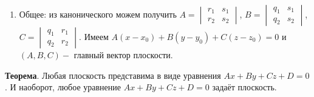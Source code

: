 \documentclass[a4paper]{article}
\begin{document}
\begin{enumerate}
                             \item Общее: из канонического можем получить $A = \begin{vmatrix}
                                                                                   r_1 & s_1 \\
                                                                                   r_2 & s_2
                             \end{vmatrix}$, $B = \begin{vmatrix}
                                                      q_1 & s_1 \\
                                                      q_2 & s_2
                             \end{vmatrix}$, $C = \begin{vmatrix}
                                                      q_1 & r_1 \\
                                                      q_2 & r_2
                             \end{vmatrix}$. Имеем $A(x-x_0)+B(y-y_0)+C(z-z_0) = 0$ и $(A,B,C) -$  главный вектор плоскости.
    \end{enumerate}

    \begin{htheorem}
        \textbf{Теорема}. Любая плоскость представима в виде уравнения $Ax+By+Cz+D=0$. И наоборот, любое уравнение $Ax+By+Cz+D=0$ задаёт плоскость.
    \end{htheorem}
\end{document}
